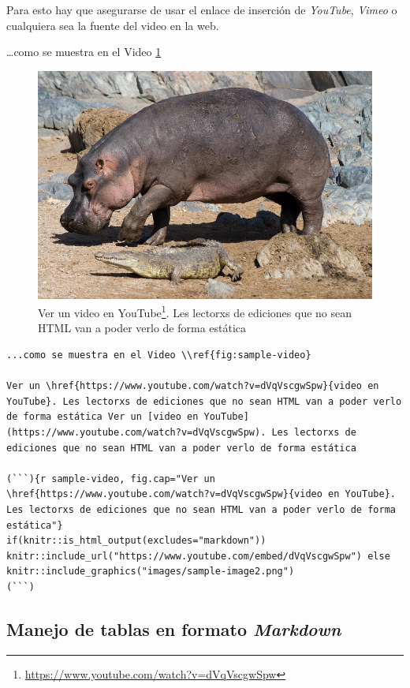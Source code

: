 \documentclass[
]{krantz}
\DeclareRobustCommand{\href}[2]{#2\footnote{\url{#1}}}
\begin{document}
Para esto hay que asegurarse de usar el enlace de inserción de \emph{YouTube}, \emph{Vimeo} o cualquiera sea la fuente del video en la web.

\ldots como se muestra en el Video \ref{fig:sample-video}



\begin{figure}
\centering
\includegraphics{images/sample-image2.png}
\caption{\label{fig:sample-video}Ver un \href{https://www.youtube.com/watch?v=dVqVscgwSpw}{video en YouTube}. Les lectorxs de ediciones que no sean HTML van a poder verlo de forma estática}
\end{figure}

\begin{verbatim}
...como se muestra en el Video \\ref{fig:sample-video}

Ver un \href{https://www.youtube.com/watch?v=dVqVscgwSpw}{video en YouTube}. Les lectorxs de ediciones que no sean HTML van a poder verlo de forma estática Ver un [video en YouTube](https://www.youtube.com/watch?v=dVqVscgwSpw). Les lectorxs de ediciones que no sean HTML van a poder verlo de forma estática

(```){r sample-video, fig.cap="Ver un \href{https://www.youtube.com/watch?v=dVqVscgwSpw}{video en YouTube}. Les lectorxs de ediciones que no sean HTML van a poder verlo de forma estática"}
if(knitr::is_html_output(excludes="markdown")) knitr::include_url("https://www.youtube.com/embed/dVqVscgwSpw") else knitr::include_graphics("images/sample-image2.png")
(```)
\end{verbatim}

\hypertarget{manejo-de-tablas-en-formato-markdown}{%
\subsection{\texorpdfstring{Manejo de tablas en formato \emph{Markdown}}{Manejo de tablas en formato Markdown}}\label{manejo-de-tablas-en-formato-markdown}}
\end{document}
